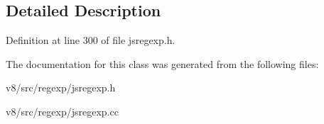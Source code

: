 \subsection{Detailed Description}


Definition at line 300 of file jsregexp.\+h.



The documentation for this class was generated from the following files\+:\begin{DoxyCompactItemize}
\item 
v8/src/regexp/jsregexp.\+h\item 
v8/src/regexp/jsregexp.\+cc\end{DoxyCompactItemize}
